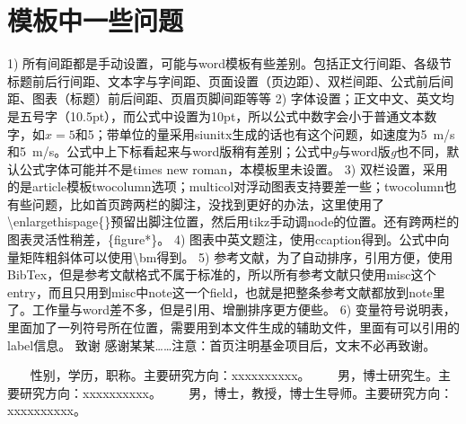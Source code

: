 \documentclass[10.5pt,twocolumn]{jbuaa}
\newcommand\mycolorRed[1]{{\color{red}#1}}
\begin{document}
 \section{\mycolorRed{模板中一些问题}}
 1) 所有\mycolorRed{间距}都是手动设置，可能与word模板有些差别。包括正文行间距、各级节标题前后行间距、文本字与字间距、页面设置（页边距）、双栏间距、公式前后间距、图表（标题）前后间距、页眉页脚间距等等
 2) \mycolorRed{字体}设置；正文中文、英文均是五号字（10.5pt），而公式中设置为10pt，所以公式中数字会小于普通文本数字，如$x=5$和5；带单位的量采用siunitx生成的话也有这个问题，如速度为\SI{5}{m/s}和5\ m/s。公式中上下标看起来与word版稍有差别；公式中$g$与word版\textit{g}也不同，默认公式字体可能并不是times new roman，本模板里未设置。
 3) \mycolorRed{双栏}设置，采用的是article模板twocolumn选项；multicol对浮动图表支持要差一些；twocolumn也有些问题，比如首页跨两栏的脚注，没找到更好的办法，这里使用了\textbackslash enlargethispage\{\}预留出脚注位置，然后用tikz手动调node的位置。还有跨两栏的图表灵活性稍差，\{figure*\}。
 4) 图表中英文题注，使用ccaption得到。公式中向量矩阵粗斜体可以使用\textbackslash bm得到。
 5) 参考文献，为了自动排序，引用方便，使用BibTex，但是参考文献格式不属于标准的，所以所有参考文献只使用misc这个entry，而且只用到misc中note这一个field，也就是把整条参考文献都放到note里了。工作量与word差不多，但是引用、增删排序更方便些。
 6) 变量符号说明表，里面加了一列符号所在位置，需要用到本文件生成的辅助文件，里面有可以引用的label信息。
 \vspace{1em}
 {\hei\wuhao 致谢\quad}
 {\fang\wuhao 
 感谢某某……注意：首页注明基金项目后，文末不必再致谢。
 }
 \renewcommand\refname{\hei\wuhao\centerline{参考文献（References）}\global\def\refname{参考文献}}
 \vskip 12pt
 \let\OLDthebibliography\thebibliography
 \renewcommand\thebibliography[1]{
   \OLDthebibliography{#1}
   \setlength{\parskip}{0pt}
   \setlength{\itemsep}{0pt plus 0.3ex}
 }
 {
 \renewcommand{\baselinestretch}{0.9}
 \liuhao
 
 
 }
 {
 \xiaowuhao
 ~~~ 性别，学历，职称。主要研究方向：xxxxxxxxxx。
 \vskip 16pt
 ~~~ 男，博士研究生。主要研究方向：xxxxxxxxxx。
 \vskip 16pt
 ~~~ 男，博士，教授，博士生导师。主要研究方向：xxxxxxxxxx。
 }
 \vskip 20pt
  
\end{document}
